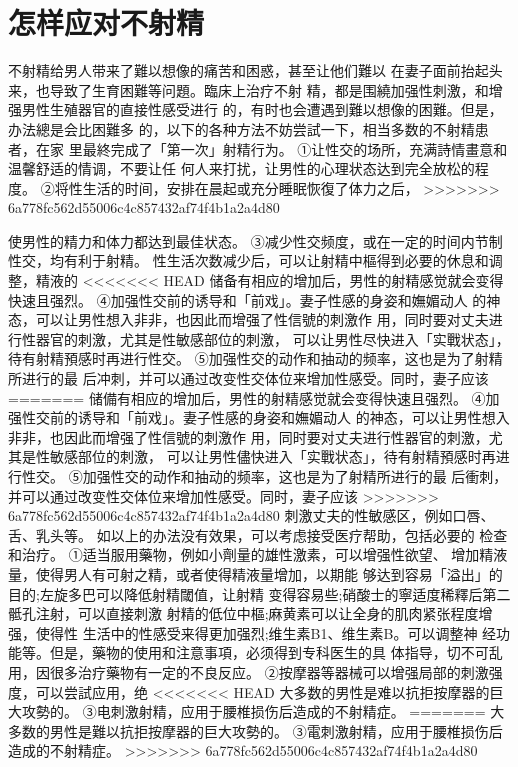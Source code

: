 \documentclass[12pt,UTF8]{ctexbook}
\begin{document}
\section{怎样应对不射精}
不射精给男人带来了難以想像的痛苦和困惑，甚至让他们難以
在妻子面前抬起头来，也导致了生育困難等问題。臨床上治疗不射
精，都是围繞加强性刺激，和增强男性生殖器官的直接性感受进行
的，有时也会遭遇到難以想像的困難。但是，办法總是会比困難多
的，以下的各种方法不妨尝試一下，相当多数的不射精患者，在家
里最終完成了「第一次」射精行为。
①让性交的场所，充满詩情畫意和温馨舒适的情调，不要让任
何人来打扰，让男性的心理状态达到完全放松的程度。
②将性生活的时间，安排在晨起或充分睡眠恢復了体力之后，
>>>>>>> 6a778fc562d55006c4c857432af74f4b1a2a4d80

使男性的精力和体力都达到最佳状态。
③减少性交频度，或在一定的时间内节制性交，均有利于射精。
性生活次数减少后，可以让射精中樞得到必要的休息和调整，精液的
<<<<<<< HEAD
储备有相应的增加后，男性的射精感觉就会变得快速且强烈。
④加强性交前的诱导和「前戏」。妻子性感的身姿和嫵媚动人
的神态，可以让男性想入非非，也因此而增强了性信號的刺激作
用，同时要对丈夫进行性器官的刺激，尤其是性敏感部位的刺激，
可以让男性尽快进入「实戰状态」，待有射精預感时再进行性交。
⑤加强性交的动作和抽动的频率，这也是为了射精所进行的最
后冲刺，并可以通过改变性交体位来增加性感受。同时，妻子应该
=======
储備有相应的增加后，男性的射精感觉就会变得快速且强烈。
④加强性交前的诱导和「前戏」。妻子性感的身姿和嫵媚动人
的神态，可以让男性想入非非，也因此而增强了性信號的刺激作
用，同时要对丈夫进行性器官的刺激，尤其是性敏感部位的刺激，
可以让男性儘快进入「实戰状态」，待有射精預感时再进行性交。
⑤加强性交的动作和抽动的频率，这也是为了射精所进行的最
后衝刺，并可以通过改变性交体位来增加性感受。同时，妻子应该
>>>>>>> 6a778fc562d55006c4c857432af74f4b1a2a4d80
刺激丈夫的性敏感区，例如口唇、舌、乳头等。
如以上的办法没有效果，可以考虑接受医疗帮助，包括必要的
检查和治疗。
①适当服用藥物，例如小劑量的雄性激素，可以增强性欲望、
增加精液量，使得男人有可射之精，或者使得精液量增加，以期能
够达到容易「溢出」的目的;左旋多巴可以降低射精閾值，让射精
变得容易些;硝酸士的寧适度稀釋后第二骶孔注射，可以直接刺激
射精的低位中樞;麻黄素可以让全身的肌肉紧张程度增强，使得性
生活中的性感受来得更加强烈;维生素B1、维生素B。可以调整神
经功能等。但是，藥物的使用和注意事項，必须得到专科医生的具
体指导，切不可乱用，因很多治疗藥物有一定的不良反应。
②按摩器等器械可以增强局部的刺激强度，可以尝試应用，绝
<<<<<<< HEAD
大多数的男性是难以抗拒按摩器的巨大攻勢的。
③电刺激射精，应用于腰椎损伤后造成的不射精症。
=======
大多数的男性是難以抗拒按摩器的巨大攻勢的。
③電刺激射精，应用于腰椎损伤后造成的不射精症。
>>>>>>> 6a778fc562d55006c4c857432af74f4b1a2a4d80
\end{document}
